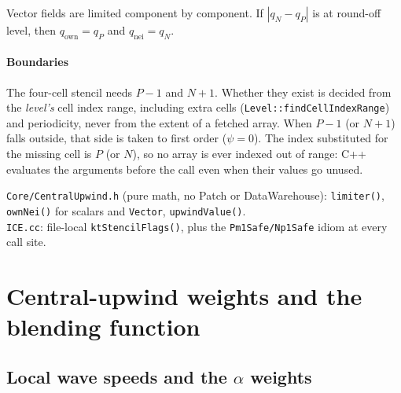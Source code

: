 \documentclass[11pt]{article}
\newcommand{\code}[1]{\texttt{\small #1}}
\newcommand{\file}[1]{\texttt{\small\color{Moss}#1}}
\newcommand{\own}{\mathrm{own}}
\newcommand{\nei}{\mathrm{nei}}
\begin{document}
\noindent Vector fields are limited component by component. If $|q_N-q_P|$ is at round-off
level, then $q_\own=q_P$ and $q_\nei=q_N$.

\paragraph{Boundaries}
The four-cell stencil needs $P-1$ and $N+1$. Whether they exist is decided from the
\emph{level's} cell index range, including extra cells (\code{Level::findCellIndexRange}) and
periodicity, never from the extent of a fetched array. When $P-1$ (or $N+1$) falls outside,
that side is taken to first order ($\psi=0$). The index substituted for the missing cell is
$P$ (or $N$), so no array is ever indexed out of range: C++ evaluates the arguments before
the call even when their values go unused.

\begin{incode}
\file{Core/CentralUpwind.h} (pure math, no Patch or DataWarehouse): \code{limiter()},
\code{ownNei()} for scalars and \code{Vector}, \code{upwindValue()}.\\
\file{ICE.cc}: file-local \code{ktStencilFlags()}, plus the \code{Pm1Safe/Np1Safe} idiom at every call site.
\end{incode}

\section{Central-upwind weights and the blending function}\label{sec:weights}

\subsection{Local wave speeds and the \texorpdfstring{$\alpha$}{alpha} weights}
\end{document}
